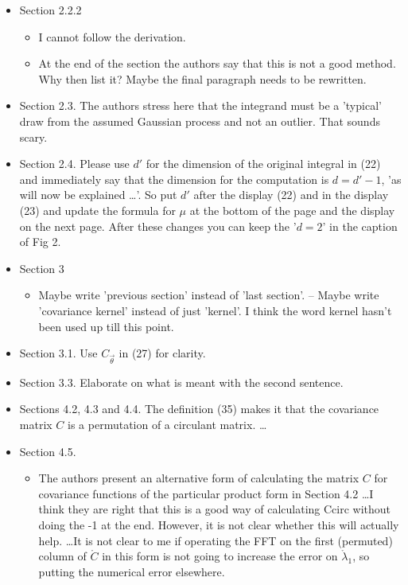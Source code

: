 \documentclass{amsart}
\begin{document}
\begin{itemize}
\item Section 2.2.2
\begin{itemize}
\item I cannot follow the derivation.
\item At the end of the section the authors say that this is not a good method.
Why then list it? Maybe the final paragraph needs to be rewritten.
\end{itemize}

\item Section 2.3. The authors stress here that the integrand must be a 'typical' draw from the assumed Gaussian process and not an outlier. That sounds scary.

\item Section 2.4. Please use $d'$ for the dimension of the original integral in (22) and
immediately say that the dimension for the computation is $d = d' - 1$, 'as will
now be explained \ldots'. So put $d'$ after the display (22) and in the display (23)
and update the formula for $\mu$ at the bottom of the page and the display on the
next page. After these changes you can keep the '$d=2$' in the caption of Fig 2.


\item Section 3
\begin{itemize}
\item Maybe write 'previous section' instead of 'last section'.
-- Maybe write 'covariance kernel' instead of just 'kernel'. I think the word
kernel hasn't been used up till this point.
\end{itemize}

\item Section 3.1. Use $C_{\vec{\theta}}$ in (27) for clarity.

\item Section 3.3. Elaborate on what is meant with the second sentence.

\item Sections 4.2, 4.3 and 4.4. 
The definition (35) makes it that the covariance matrix $C$ is a permutation
of a circulant matrix. \ldots

\item  Section 4.5. 
\begin{itemize}
    \item The authors present an alternative form of calculating the matrix $C$ for
covariance functions of the particular product form in Section 4.2 \ldots I think they are right that this is a good
way of calculating Ccirc without doing the -1 at the end.
However, it is not clear whether this will actually help. \ldots It is not clear to me if operating
the FFT on the first (permuted) column of $\mathring{C}$ in this form is not going to
increase the error on $\mathring{\lambda}_1$, so putting the numerical error elsewhere.


\end{itemize}
\end{itemize}
\end{document}
